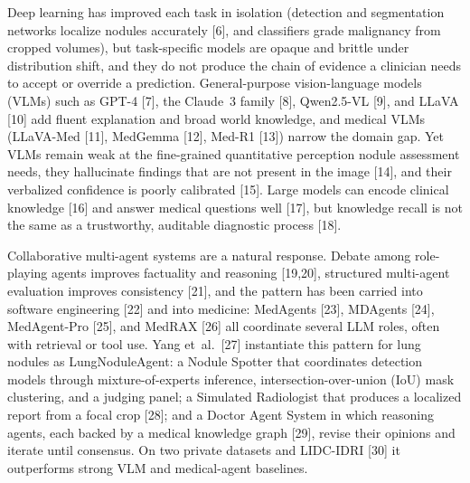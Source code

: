 \documentclass[12pt]{article}
\begin{document}
Deep learning has improved each task in isolation (detection and segmentation networks localize nodules accurately [6], and classifiers grade malignancy from cropped volumes), but task-specific models are opaque and brittle under distribution shift, and they do not produce the chain of evidence a clinician needs to accept or override a prediction. General-purpose vision-language models (VLMs) such as GPT-4 [7], the Claude~3 family [8], Qwen2.5-VL [9], and LLaVA [10] add fluent explanation and broad world knowledge, and medical VLMs (LLaVA-Med [11], MedGemma [12], Med-R1 [13]) narrow the domain gap. Yet VLMs remain weak at the fine-grained quantitative perception nodule assessment needs, they hallucinate findings that are not present in the image [14], and their verbalized confidence is poorly calibrated [15]. Large models can encode clinical knowledge [16] and answer medical questions well [17], but knowledge recall is not the same as a trustworthy, auditable diagnostic process [18].


Collaborative multi-agent systems are a natural response. Debate among role-playing agents improves factuality and reasoning [19,20], structured multi-agent evaluation improves consistency [21], and the pattern has been carried into software engineering [22] and into medicine: MedAgents [23], MDAgents [24], MedAgent-Pro [25], and MedRAX [26] all coordinate several LLM roles, often with retrieval or tool use. Yang et~al.~[27] instantiate this pattern for lung nodules as LungNoduleAgent: a Nodule Spotter that coordinates detection models through mixture-of-experts inference, intersection-over-union (IoU) mask clustering, and a judging panel; a Simulated Radiologist that produces a localized report from a focal crop [28]; and a Doctor Agent System in which reasoning agents, each backed by a medical knowledge graph [29], revise their opinions and iterate until consensus. On two private datasets and LIDC-IDRI [30] it outperforms strong VLM and medical-agent baselines.
\end{document}
